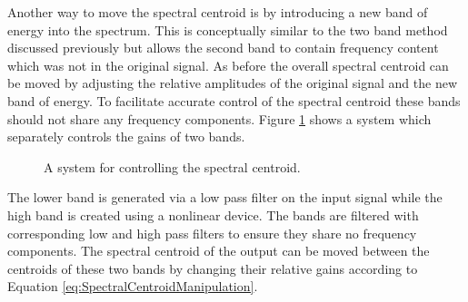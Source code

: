 			Another way to move the spectral centroid is by introducing a new band of energy into the spectrum.
			This is conceptually similar to the two band method discussed previously but allows the second band
			to contain frequency content which was not in the original signal. As before the overall spectral
			centroid can be moved by adjusting the relative amplitudes of the original signal and the new band
			of energy. To facilitate accurate control of the spectral centroid these bands should not share any
			frequency components. Figure \ref{fig:TwoBandSpectralCentroidSystem} shows a system which
			separately controls the gains of two bands.

			\begin{figure}[h!]
				\centering
				\caption{A system for controlling the spectral centroid.}
				\label{fig:TwoBandSpectralCentroidSystem}
			\end{figure}

			The lower band is generated via a low pass filter on the input signal while the high band is
			created using a nonlinear device. The bands are filtered with corresponding low and high pass
			filters to ensure they share no frequency components. The spectral centroid of the output can be
			moved between the centroids of these two bands by changing their relative gains according to
			Equation \ref{eq:SpectralCentroidManipulation}.

